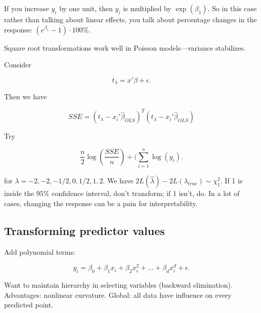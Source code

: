 If you increase \(y_i\) by one unit, then \(y_i\) is multiplied by \(\exp(\beta_1)\). So in this case rather than talking about linear effects, you talk about percentage changes in the response: \((e^{\beta_1} - 1) \cdot 100 \%\).

Square root transformations work well in Poisson models---variance stabilizes. 

Consider

\[
t_\lambda = x'\beta + \epsilon.
\]

Then we have

\[
SSE = (t_\lambda - x_i' \hat{\beta}_{OLS})^T(t_\lambda - x_i' \hat{\beta}_{OLS}) 
\]

Try

\[
\frac{n}{2} \log \left(  \frac{SSE}{n} \right) + (\sum_{i=1}^n \log(y_i).
\]

for \(\lambda= -2, -2, -1/2, 0, 1/2, 1, 2\). We have \(2 L(\hat{\lambda}) - 2 L(\lambda_{true}) \sim \chi_1^2\). If 1 is inside the \(95\%\) confidence interval, don't transform; if 1 isn't, do. In a lot of cases, changing the response can be a pain for interpretability.

\subsection{Transforming predictor values}

Add polynomial terms:

\[
y_i = \beta_0 + \beta_1 x_i + \beta_2 x_i^2 + \ldots + \beta_d x_i^d + \epsilon.
\]

Want to maintain hierarchy in selecting variables (backward elimination). Advantages: nonlinear curvature. Global: all data have influence on every predicted point.


 
%
%
%
%
%
%
%
%
%
%
%
%




